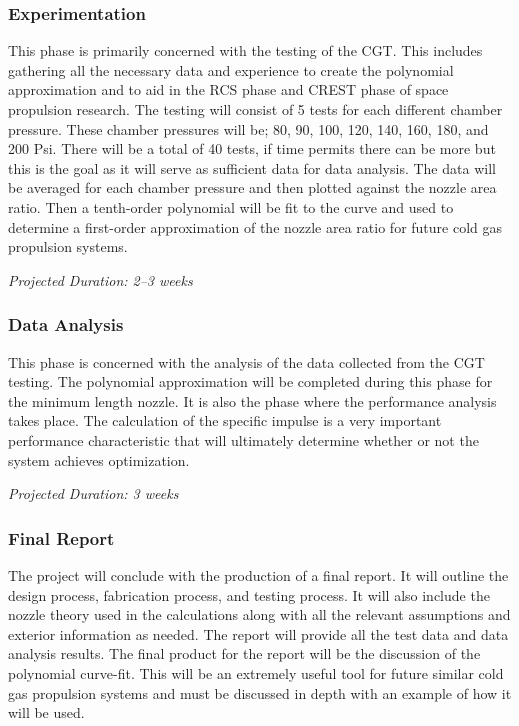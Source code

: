 \documentclass[conference]{IEEEtran} %
\begin{document}
\subsubsection{Experimentation}
\label{subsubsec:experimentation}
    This phase is primarily concerned with the testing of the CGT\@. This includes gathering all the necessary data and experience to create the
    polynomial approximation and to aid in the RCS phase and CREST phase of space propulsion research.
    The testing will consist of 5 tests for each different chamber pressure. These chamber pressures will be; 80, 90, 100, 120, 140, 160, 180, and 200 Psi. There
    will be a total of 40 tests, if time permits there can be more but this is the goal as it will serve as sufficient data for data analysis.
     The data will be averaged for each chamber pressure and then plotted against the nozzle area ratio. Then a tenth-order polynomial
    will be fit to the curve and used to determine a first-order approximation of the nozzle area ratio for future cold gas propulsion systems.

    \textit{Projected Duration: 2--3 weeks}

\subsubsection{Data Analysis}
\label{subsubsec: data analysis}
    This phase is concerned with the analysis of the data collected from the CGT testing. The polynomial approximation will be completed during this
    phase for the minimum length nozzle. It is also the phase where the performance analysis takes place. The calculation of the specific impulse is a very important
    performance characteristic that will ultimately determine whether or not the system achieves optimization.

    \textit{Projected Duration: 3 weeks}

\subsubsection{Final Report}
\label{subsubsec: final report}
    The project will conclude with the production of a final report. It will outline the design process, fabrication process, and testing process.
    It will also include the nozzle theory used in the calculations along with all the relevant assumptions and exterior information as needed. The report will provide
    all the test data and data analysis results. The final product for the report will be the discussion of the polynomial curve-fit. This will be an extremely useful tool
    for future similar cold gas propulsion systems and must be discussed in depth with an example of how it will be used.
\end{document}
